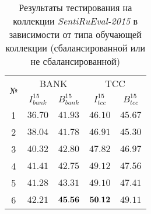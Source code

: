\begin{table}[ht!]
\centering
\caption{Результаты тестирования на коллекции {\it SentiRuEval-2015}
в зависимости от типа обучающей коллекции (сбалансированной или не сбалансированной)}
\label{table:results2015}
\begin{tabular}{ccccc}
\hline
\multicolumn{1}{c|}{\multirow{2}{*}{№}} & \multicolumn{2}{c|}{BANK}                                                   & \multicolumn{2}{c}{TCC}                                                  \\ \cline{2-5}
\multicolumn{1}{c|}{}                   & \multicolumn{1}{c|}{$I_{bank}^{15}$} & \multicolumn{1}{c|}{$B_{bank}^{15}$} & \multicolumn{1}{c|}{$I_{tcc}^{15}$} & \multicolumn{1}{c}{$B_{tcc}^{15}$} \\ \hline
1                                       & $36.70$                              & $41.93$                              & $46.10$                             & $45.67$                            \\
2                                       & $38.04$                              & $41.78$                              & $46.91$                             & $45.30$                            \\
3                                       & $40.32$                              & $42.80$                              & $47.82$                             & $46.97$                            \\
4                                       & $41.41$                              & $42.75$                              & $49.12$                             & $47.56$                            \\
5                                       & $41.28$                              & $43.31$                              & $49.10$                             & $47.41$                            \\
6                                       & $42.21$                              & ${\bf 45.56}$                        & ${\bf50.12}$                       & $49.11$                            \\ \hline
\end{tabular}
\end{table}
